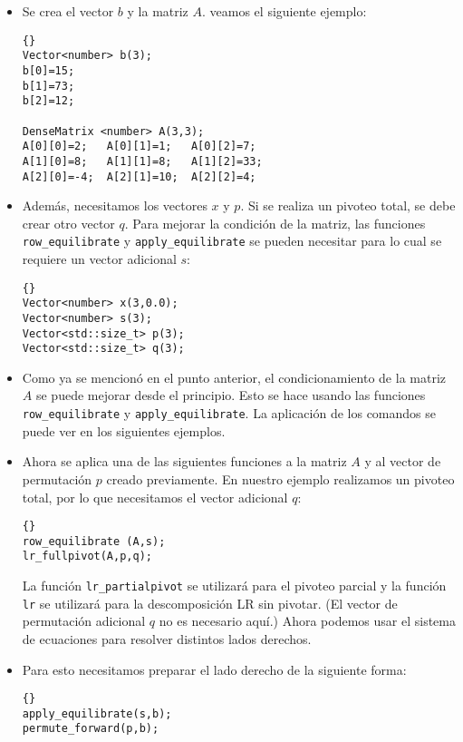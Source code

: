 \begin{itemize}
\item Se crea el vector $b$ y la matriz $A$. veamos el siguiente ejemplo:

  {\footnotesize{\begin{lstlisting}{}
Vector<number> b(3);
b[0]=15;
b[1]=73;
b[2]=12;

DenseMatrix <number> A(3,3);
A[0][0]=2;   A[0][1]=1;   A[0][2]=7;
A[1][0]=8;   A[1][1]=8;   A[1][2]=33;
A[2][0]=-4;  A[2][1]=10;  A[2][2]=4;
\end{lstlisting}}}

\item Además, necesitamos los vectores $x$ y $p$. Si se realiza un pivoteo total, 
se debe crear otro vector $q$. Para mejorar la condición de la matriz, 
las funciones \lstinline{row_equilibrate} y \lstinline{apply_equilibrate} se pueden necesitar
para lo cual se requiere un vector adicional $s$:

  {\footnotesize{\begin{lstlisting}{}
Vector<number> x(3,0.0);
Vector<number> s(3);
Vector<std::size_t> p(3);
Vector<std::size_t> q(3);
\end{lstlisting}}}

\item Como ya se mencionó en el punto anterior, el condicionamiento de la matriz $A$ 
  se puede mejorar desde el principio. Esto se hace usando las funciones \lstinline{row_equilibrate}
  y \lstinline{apply_equilibrate}. La aplicación de los comandos se puede ver en los siguientes ejemplos.

\item Ahora se aplica una de las siguientes funciones a la matriz $A$ y al vector de permutación 
$p$ creado previamente. En nuestro ejemplo realizamos un pivoteo total, por lo que 
necesitamos el vector adicional $q$:
  {\footnotesize{\begin{lstlisting}{}
row_equilibrate (A,s);
lr_fullpivot(A,p,q);
\end{lstlisting}}}
La función \lstinline{lr_partialpivot} se utilizará para el pivoteo parcial 
y la función \lstinline{lr} se utilizará para la descomposición LR sin pivotar.
(El vector de permutación adicional $q$ no es necesario aquí.) Ahora podemos 
usar el sistema de ecuaciones para resolver distintos lados derechos.

\item Para esto necesitamos preparar el lado derecho de la siguiente forma:

{\footnotesize{\begin{lstlisting}{}
apply_equilibrate(s,b);
permute_forward(p,b);
\end{lstlisting}}}


\end{itemize}
